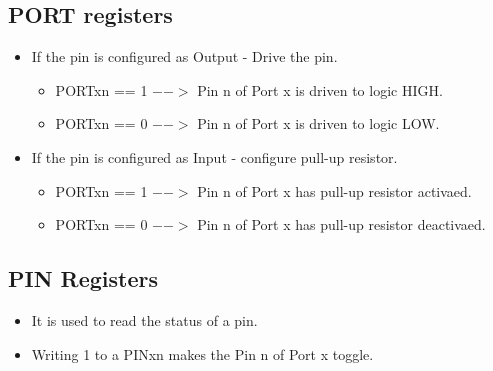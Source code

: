 \documentclass{article}
\begin{document}
\subsection{PORT registers}
\begin{itemize}
    \item If the pin is configured as Output - Drive the pin.
    \begin{itemize}
        \item PORTxn == 1 $-->$ Pin n of Port x is driven to logic HIGH.
        \item PORTxn == 0 $-->$ Pin n of Port x is driven to logic LOW.
    \end{itemize}
    \item If the pin is configured as Input - configure pull-up resistor.
    \begin{itemize}
        \item PORTxn == 1 $-->$ Pin n of Port x has pull-up resistor activaed.
        \item PORTxn == 0 $-->$ Pin n of Port x has pull-up resistor deactivaed.
    \end{itemize}
\end{itemize}

\subsection{PIN Registers}
\begin{itemize}
    \item It is used to read the status of a pin.
    \item Writing 1 to a PINxn makes the Pin n of Port x toggle.
\end{itemize}
\end{document}
